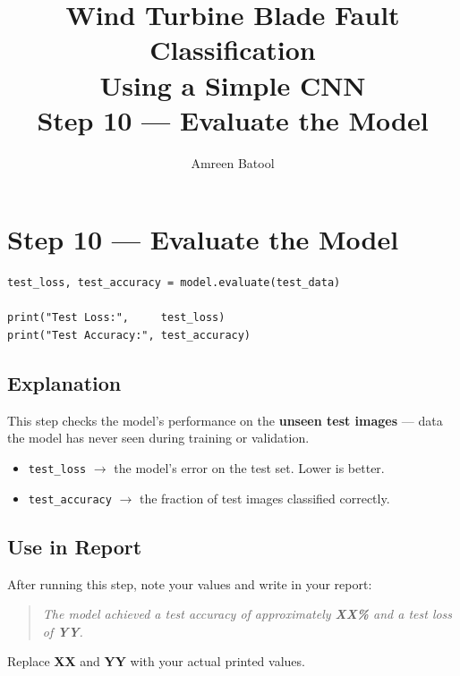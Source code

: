 \documentclass[12pt]{article}
\title{\textbf{Wind Turbine Blade Fault Classification\\Using a Simple CNN}\\[0.5em]
\large Step 10 --- Evaluate the Model}
\author{Amreen Batool}
\date{}
\begin{document}
\maketitle

\section*{Step 10 --- Evaluate the Model}

\begin{lstlisting}[style=pythonstyle]
test_loss, test_accuracy = model.evaluate(test_data)

print("Test Loss:",     test_loss)
print("Test Accuracy:", test_accuracy)
\end{lstlisting}

\subsection*{Explanation}

This step checks the model's performance on the \textbf{unseen test images} — data the model has never seen during training or validation.

\begin{itemize}
    \item \texttt{test\_loss} $\rightarrow$ the model's error on the test set. Lower is better.
    \item \texttt{test\_accuracy} $\rightarrow$ the fraction of test images classified correctly.
\end{itemize}

\subsection*{Use in Report}

After running this step, note your values and write in your report:

\begin{quote}
\textit{The model achieved a test accuracy of approximately \textbf{XX\%} and a test loss of \textbf{YY}.}
\end{quote}

Replace \textbf{XX} and \textbf{YY} with your actual printed values.
\end{document}
